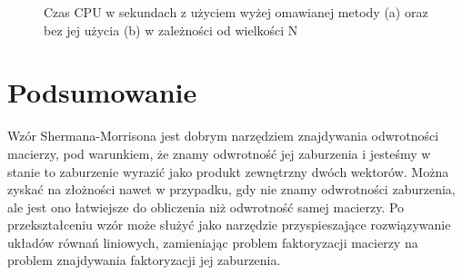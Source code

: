 \documentclass[11pt]{extarticle}
\begin{document}
	\begin{figure}
		\caption{Czas CPU w sekundach z użyciem wyżej omawianej metody (a) oraz bez jej użycia (b) w zależności od wielkości N}
	\end{figure}

	\section{Podsumowanie}
	Wzór Shermana-Morrisona jest dobrym narzędziem znajdywania odwrotności macierzy,
	pod warunkiem, że znamy odwrotność jej zaburzenia i
	jesteśmy w stanie to zaburzenie wyrazić jako produkt zewnętrzny dwóch wektorów.
	Można zyskać na złożności nawet w przypadku, gdy nie znamy odwrotności zaburzenia,
	ale jest ono łatwiejsze do obliczenia niż odwrotność samej macierzy.
	Po przekształceniu wzór może służyć jako narzędzie przyspieszające rozwiązywanie układów równań liniowych,
	zamieniając problem faktoryzacji macierzy na problem znajdywania faktoryzacji jej zaburzenia.
\end{document}
